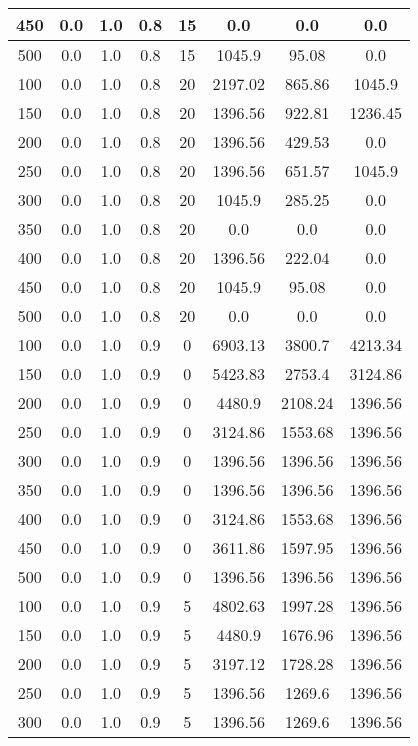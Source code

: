 \documentclass[a4paper, 12pt]{extreport}
\begin{document}
\begin{itemize}
\begin{longtable}{|c|c|c|c|c|c|c|c|}
			450 & 0.0 & 1.0 & 0.8 & 15 & 0.0 & 0.0 & 0.0 \\\hline
			500 & 0.0 & 1.0 & 0.8 & 15 & 1045.9 & 95.08 & 0.0 \\\hline
			100 & 0.0 & 1.0 & 0.8 & 20 & 2197.02 & 865.86 & 1045.9 \\\hline
			150 & 0.0 & 1.0 & 0.8 & 20 & 1396.56 & 922.81 & 1236.45 \\\hline
			200 & 0.0 & 1.0 & 0.8 & 20 & 1396.56 & 429.53 & 0.0 \\\hline
			250 & 0.0 & 1.0 & 0.8 & 20 & 1396.56 & 651.57 & 1045.9 \\\hline
			300 & 0.0 & 1.0 & 0.8 & 20 & 1045.9 & 285.25 & 0.0 \\\hline
			350 & 0.0 & 1.0 & 0.8 & 20 & 0.0 & 0.0 & 0.0 \\\hline
			400 & 0.0 & 1.0 & 0.8 & 20 & 1396.56 & 222.04 & 0.0 \\\hline
			450 & 0.0 & 1.0 & 0.8 & 20 & 1045.9 & 95.08 & 0.0 \\\hline
			500 & 0.0 & 1.0 & 0.8 & 20 & 0.0 & 0.0 & 0.0 \\\hline
			100 & 0.0 & 1.0 & 0.9 & 0 & 6903.13 & 3800.7 & 4213.34 \\\hline
			150 & 0.0 & 1.0 & 0.9 & 0 & 5423.83 & 2753.4 & 3124.86 \\\hline
			200 & 0.0 & 1.0 & 0.9 & 0 & 4480.9 & 2108.24 & 1396.56 \\\hline
			250 & 0.0 & 1.0 & 0.9 & 0 & 3124.86 & 1553.68 & 1396.56 \\\hline
			300 & 0.0 & 1.0 & 0.9 & 0 & 1396.56 & 1396.56 & 1396.56 \\\hline
			350 & 0.0 & 1.0 & 0.9 & 0 & 1396.56 & 1396.56 & 1396.56 \\\hline
			400 & 0.0 & 1.0 & 0.9 & 0 & 3124.86 & 1553.68 & 1396.56 \\\hline
			450 & 0.0 & 1.0 & 0.9 & 0 & 3611.86 & 1597.95 & 1396.56 \\\hline
			500 & 0.0 & 1.0 & 0.9 & 0 & 1396.56 & 1396.56 & 1396.56 \\\hline
			100 & 0.0 & 1.0 & 0.9 & 5 & 4802.63 & 1997.28 & 1396.56 \\\hline
			150 & 0.0 & 1.0 & 0.9 & 5 & 4480.9 & 1676.96 & 1396.56 \\\hline
			200 & 0.0 & 1.0 & 0.9 & 5 & 3197.12 & 1728.28 & 1396.56 \\\hline
			250 & 0.0 & 1.0 & 0.9 & 5 & 1396.56 & 1269.6 & 1396.56 \\\hline
			300 & 0.0 & 1.0 & 0.9 & 5 & 1396.56 & 1269.6 & 1396.56 \\\hline

\end{longtable}
\end{itemize}
\end{document}
